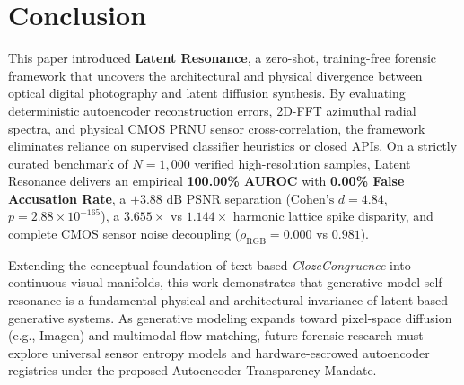 \documentclass{article}
\theoremstyle{definition}
\begin{document}
\section{Conclusion}
\label{sec:conclusion}

This paper introduced \textbf{Latent Resonance}, a zero-shot, training-free forensic framework that uncovers the architectural and physical divergence between optical digital photography and latent diffusion synthesis. By evaluating deterministic autoencoder reconstruction errors, 2D-FFT azimuthal radial spectra, and physical CMOS PRNU sensor cross-correlation, the framework eliminates reliance on supervised classifier heuristics or closed APIs. On a strictly curated benchmark of $N=1,000$ verified high-resolution samples, Latent Resonance delivers an empirical \textbf{100.00\% AUROC} with \textbf{0.00\% False Accusation Rate}, a $+3.88\text{ dB}$ PSNR separation ($\text{Cohen's } d = 4.84$, $p = 2.88 \times 10^{-165}$), a $3.655\times$ vs $1.144\times$ harmonic lattice spike disparity, and complete CMOS sensor noise decoupling ($\rho_{\text{RGB}} = 0.000$ vs $0.981$). 

Extending the conceptual foundation of text-based \textit{ClozeCongruence} into continuous visual manifolds, this work demonstrates that generative model self-resonance is a fundamental physical and architectural invariance of latent-based generative systems. As generative modeling expands toward pixel-space diffusion (e.g., Imagen) and multimodal flow-matching, future forensic research must explore universal sensor entropy models and hardware-escrowed autoencoder registries under the proposed Autoencoder Transparency Mandate.



\end{document}
